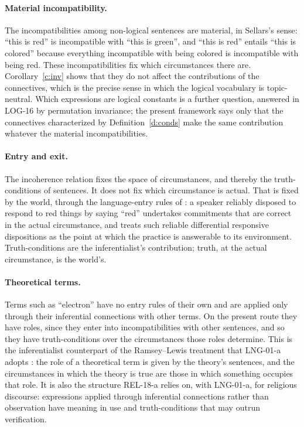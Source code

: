 \documentclass{situationist-preprint}
\begin{document}
\paragraph{Material incompatibility.} The incompatibilities among non-logical sentences are material, in Sellars's sense: \enquote{this is red} is incompatible with \enquote{this is green}, and \enquote{this is red} entails \enquote{this is colored} because everything incompatible with being colored is incompatible with being red. These incompatibilities fix which circumstances there are. Corollary~\ref{c:inv} shows that they do not affect the contributions of the connectives, which is the precise sense in which the logical vocabulary is topic-neutral. Which expressions are logical constants is a further question, answered in LOG-16 by permutation invariance; the present framework says only that the connectives characterized by Definition~\ref{d:conds} make the same contribution whatever the material incompatibilities.

\paragraph{Entry and exit.} The incoherence relation fixes the space of circumstances, and thereby the truth-conditions of sentences. It does not fix which circumstance is actual. That is fixed by the world, through the language-entry rules of \citet{Sellars1954}: a speaker reliably disposed to respond to red things by saying \enquote{red} undertakes commitments that are correct in the actual circumstance, and \citet[ch.~4]{Brandom1994} treats such reliable differential responsive dispositions as the point at which the practice is answerable to its environment. Truth-conditions are the inferentialist's contribution; truth, at the actual circumstance, is the world's.

\paragraph{Theoretical terms.} Terms such as \enquote{electron} have no entry rules of their own and are applied only through their inferential connections with other terms. On the present route they have roles, since they enter into incompatibilities with other sentences, and so they have truth-conditions over the circumstances those roles determine. This is the inferentialist counterpart of the Ramsey--Lewis treatment that LNG-01-a adopts \citep{Lewis1970}: the role of a theoretical term is given by the theory's sentences, and the circumstances in which the theory is true are those in which something occupies that role. It is also the structure REL-18-a relies on, with LNG-01-a, for religious discourse: expressions applied through inferential connections rather than observation have meaning in use and truth-conditions that may outrun verification.
\end{document}
